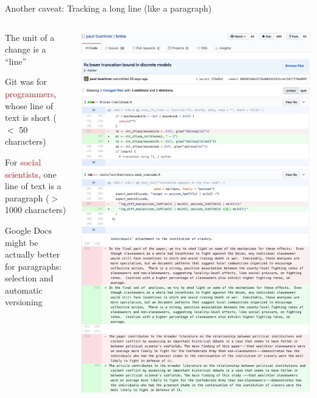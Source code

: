 \documentclass[ignorenonframetext, 10pt, aspectratio=169]{beamer}
\begin{document}
\begin{frame}{Another caveat: Tracking a long line (like a paragraph)}
\begin{columns}[T]
\begin{column}{0.4\textwidth}
\begin{wideitemize}
\item<1-> The unit of a change is a ``line''
\item<1-> Git was for \textcolor{red}{programmers}, whose line of text is short ($<$ 50 characters)
\item<2-> For \textcolor{red}{social scientists}, one line of text is a paragraph ($>$ 1000 characters)
\item<3-> Google Docs might be actually better for paragraphs: selection and automatic versioning
\end{wideitemize}
\end{column}
\begin{column}{0.6\textwidth}
\begin{overprint}
\includegraphics[width = \linewidth]{software-dev-diff.png}
\includegraphics[width = \linewidth]{long-diff-2.png}

\end{overprint}
\end{column}
\end{columns}
\end{frame}
\end{document}
